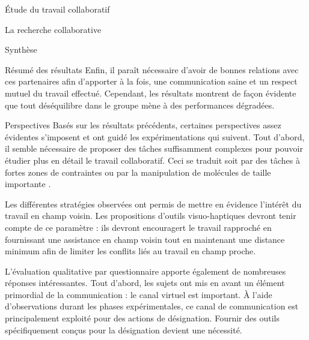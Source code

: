 \documentclass[myfrancais]{mythesis}
\begin{document}
\begin{mypart}{Étude du travail collaboratif}
\begin{mychapter}{La recherche collaborative}
\begin{mysection}{Synthèse}
\begin{mysubsection}{Résumé des résultats}
					Enfin, il paraît nécessaire d'avoir de bonnes relations avec ces partenaires afin d'apporter à la fois, une communication saine et un respect mutuel du travail effectué.
					Cependant, les résultats montrent de façon évidente que tout déséquilibre dans le groupe mène à des performances dégradées.
				\end{mysubsection}
				\begin{mysubsection}{Perspectives}
					Basés sur les résultats précédents, certaines perspectives assez évidentes s'imposent et ont guidé les expérimentations qui suivent.
					Tout d'abord, il semble nécessaire de proposer des tâches suffisamment complexes pour pouvoir étudier plus en détail le travail collaboratif.
					Ceci se traduit soit par des tâches à fortes zones de contraintes  ou par la manipulation de molécules de taille importante .

					Les différentes stratégies observées ont permis de mettre en évidence l'intérêt du travail en champ voisin.
					Les propositions d'outils visuo-haptiques devront tenir compte de ce paramètre : ils devront encouragert le travail rapproché en fournissant une assistance en champ voisin tout en maintenant une distance minimum afin de limiter les conflits liés au travail en champ proche.

					L'évaluation qualitative par questionnaire apporte également de nombreuses réponses intéressantes.
					Tout d'abord, les sujets ont mis en avant un élément primordial de la communication : le canal virtuel est important.
					À l'aide d'observations durant les phases expérimentales, ce canal de communication est principalement exploité pour des actions de désignation.
					Fournir des outils spécifiquement conçus pour la désignation devient une nécessité.


\end{mysubsection}
\end{mysection}
\end{mychapter}
\end{mypart}
\end{document}
